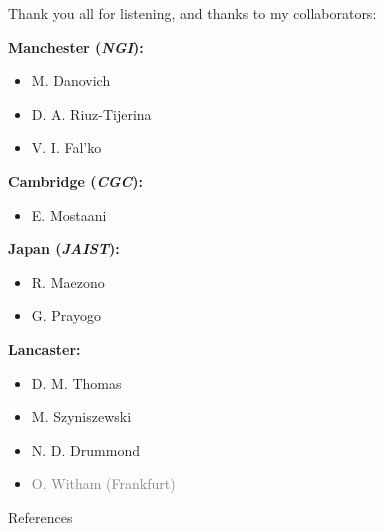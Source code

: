 \documentclass[12pt, pdf, hyperref={draft}, usenames, dvipsnames]{beamer}
\begin{document}
\begin{frame}[plain]
\begin{center}
  {\Large Thank you all for listening, and thanks to my
collaborators:}
\end{center}

\vfill

\begin{minipage}[t]{0.45\textwidth}

{\bf Manchester (\textit{NGI}):}
\begin{itemize}
  \item M. Danovich
  \item D. A. Riuz-Tijerina
  \item V. I. Fal'ko
\end{itemize}

\vspace{0.5cm}

{\bf Cambridge (\textit{CGC}):}
\begin{itemize}
  \item E. Mostaani
\end{itemize}

\end{minipage}%
\hfill
\begin{minipage}[t]{0.45\textwidth}

{\bf Japan (\textit{JAIST}):}
\begin{itemize}
  \item R. Maezono
  \item G. Prayogo
\end{itemize}

\vspace{0.5cm}

{\bf Lancaster:}
\begin{itemize}
  \item D. M. Thomas
  \item M. Szyniszewski
  \item N. D. Drummond
  \item \textcolor{gray}{O. Witham (Frankfurt)}
\end{itemize}

\end{minipage}%
\end{frame}

\begin{frame}[t,allowframebreaks]{References}

\printbibliography[]

\end{frame}
\end{document}
